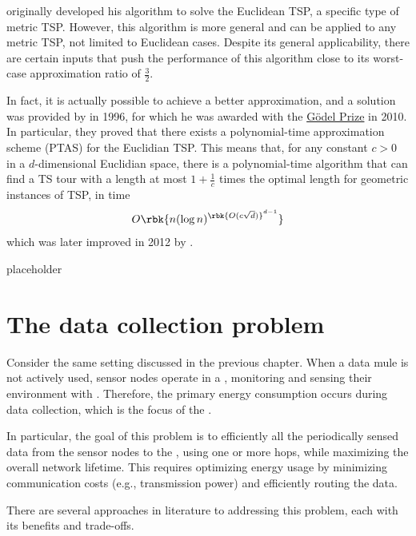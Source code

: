 \documentclass[a4paper, 12pt]{report}
\begin{document}
    \textcite{christofides} originally developed his algorithm to solve the Euclidean TSP, a specific type of metric TSP. However, this algorithm is more general and can be applied to any metric TSP, not limited to Euclidean cases. Despite its general applicability, there are certain inputs that push the performance of this algorithm close to its worst-case approximation ratio of $\frac{3}{2}$.

    In fact, it is actually possible to achieve a better approximation, and a solution was provided by \textcite{arora} in 1996, for which he was awarded with the \href{https://en.wikipedia.org/wiki/G%C3%B6del_Prize}{Gödel Prize} in 2010. In particular, they proved that there exists a polynomial-time approximation scheme (PTAS) for the Euclidian TSP. This means that, for any constant $c > 0$ in a $d$-dimensional Euclidian space, there is a polynomial-time algorithm that can find a TS tour with a length at most $1 + \frac{1}{c}$ times the optimal length for geometric instances of TSP, in time $$O\rbk{n (\log n)^{{\rbk{O(c \sqrt d)}}^{d - 1}}}$$ which was later improved in 2012 by \textcite{bartal}.

    placeholder 

    \chapter{The data collection problem}

    Consider the same setting discussed in the previous chapter. When a data mule is not actively used, sensor nodes operate in a , monitoring and sensing their environment with . Therefore, the primary energy consumption occurs during data collection, which is the focus of the .

    In particular, the goal of this problem is to efficiently  all the periodically sensed data from the sensor nodes to the , using one or more hops, while maximizing the overall network lifetime. This requires optimizing energy usage by minimizing communication costs (e.g., transmission power) and efficiently routing the data.

    There are several approaches in literature to addressing this problem, each with its benefits and trade-offs.
\end{document}
